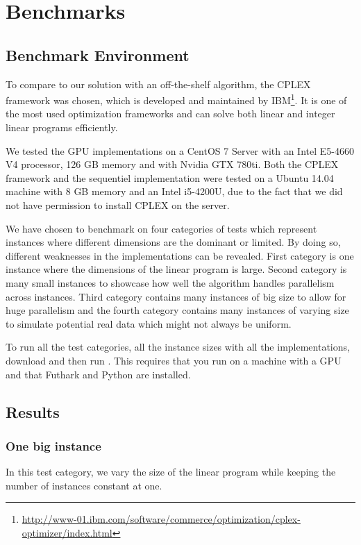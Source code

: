 \section{Benchmarks}
\subsection{Benchmark Environment}
To compare to our solution with an off-the-shelf algorithm, the CPLEX framework was chosen, which is developed and maintained by IBM\footnote{\url{http://www-01.ibm.com/software/commerce/optimization/cplex-optimizer/index.html}}. It is one of the most used optimization frameworks and can solve both linear and integer linear programs efficiently.

We tested the GPU implementations on a CentOS 7 Server with an Intel E5-4660 V4 processor, 126 GB memory and with Nvidia GTX 780ti. Both the CPLEX framework and the sequentiel 
implementation were tested on a Ubuntu 14.04 machine with 8 GB memory and an Intel i5-4200U, due to the fact that we did not have permission to install CPLEX on the server.

\newpar We have chosen to benchmark on four categories of tests which represent instances where different dimensions are the dominant or limited. By doing so, different weaknesses in the implementations can be revealed. First category is one instance where the dimensions of the linear program is large. Second category is many small instances to showcase how well the algorithm handles parallelism across instances. Third category contains many instances of big size to allow for huge parallelism and the fourth category contains many instances of varying size to simulate potential real data which might not always be uniform.

\newpar To run all the test categories, all the instance sizes with all the implementations, download  and then run . This requires that you run on a machine with a GPU and that Futhark and Python are installed.

\subsection{Results}

\subsubsection{One big instance}
In this test category, we vary the size of the linear program while keeping the number of instances constant at one.

